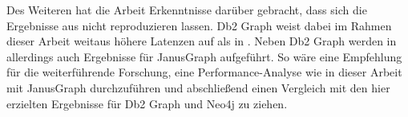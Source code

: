 Des Weiteren hat die Arbeit Erkenntnisse darüber gebracht, dass sich die Ergebnisse aus \cite{sigmod_tian} nicht reproduzieren lassen. Db2 Graph weist dabei im Rahmen dieser Arbeit weitaus höhere Latenzen auf als in \cite{sigmod_tian}. Neben Db2 Graph werden in \cite{sigmod_tian} allerdings auch Ergebnisse für JanusGraph aufgeführt. So wäre eine Empfehlung für die weiterführende Forschung, eine Performance-Analyse wie in dieser Arbeit mit JanusGraph durchzuführen und abschließend einen Vergleich mit den hier erzielten Ergebnisse für Db2 Graph und Neo4j zu ziehen.